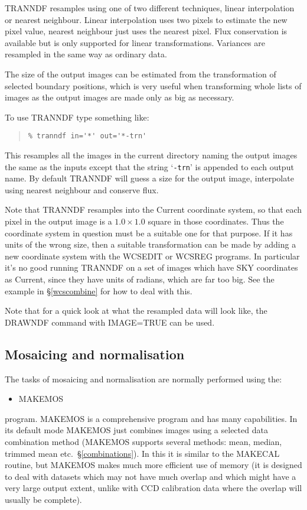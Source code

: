 \documentclass[twoside,11pt]{article}
\newcommand{\hyperref}[4]{#2\ref{#4}#3}
\newcommand{\htmlref}[2]{#1}
\newcommand{\latexhtml}[2]{#1}
\newcommand{\xlabel}[1]{}
\renewcommand{\_}{\texttt{\symbol{95}}}
\newcommand{\ttsize}{\latexhtml{\small}{}}
\newenvironment{myquote}{\begin{quote}\ttsize}{\end{quote}}
\newcommand{\text}[1]{{\ttsize \tt #1}}
\newcommand{\routine}[1]{{\sc #1}}
\newcommand{\xroutine}[1]{\htmlref{{\sc #1}}{#1}}
\begin{document}
\routine{TRANNDF} resamples using 
one of two different techniques, linear interpolation
or nearest neighbour. Linear interpolation uses two pixels to estimate
the new pixel value, nearest neighbour just uses the nearest pixel. Flux
conservation is available but is only supported for linear
transformations. Variances are resampled in the same way as ordinary
data.

The size of the output images can be estimated from the transformation of
selected boundary positions, which is very useful when transforming whole
lists of images as the output images are made only as big as necessary.

To use \routine{TRANNDF} type something like:
\begin{myquote}
\begin{verbatim}
% tranndf in='*' out='*-trn'
\end{verbatim}
\end{myquote}
This resamples all the images in the current directory naming the output
images the same as the inputs except that the string `\text{-trn}' is
appended to each output name. 
By default \routine{TRANNDF} will guess a size for
the output image, interpolate using nearest neighbour and conserve flux.

Note that \routine{TRANNDF} resamples into the Current coordinate system,
so that each pixel in the output image is a $1.0 \times 1.0$ square 
in those coordinates.  Thus the coordinate system in question must be
a suitable one for that purpose.  If it has units of 
the wrong size, then a suitable transformation can be made by
adding a new coordinate system with the
\xroutine{WCSEDIT} or \xroutine{WCSREG} programs.
In particular it's no good running \routine{TRANNDF} on a set of
images which have SKY coordinates as Current, since they have
units of radians, which are far too big.
See the example in \hyperref{the section about WCSREG}{\S }{}{wcscombine}
for how to deal with this.

Note that for a quick look at what the resampled data will look like,
the \xroutine{DRAWNDF} command with IMAGE=TRUE can be used.


\subsection{\xlabel{mosaic_normalise}\label{mos_norm}Mosaicing and 
            normalisation}

The tasks of mosaicing and normalisation are normally performed using the:
\begin{itemize}
\item \xroutine{MAKEMOS}
\end{itemize}
program.
\routine{MAKEMOS} is a comprehensive program and has many
capabilities. In its default mode \routine{MAKEMOS} 
just combines images using a
selected data combination method (\routine{MAKEMOS} supports several
methods: mean, median, trimmed mean etc.\ \S\ref{combinations}).
In this it is similar to the \xroutine{MAKECAL} routine, but
\routine{MAKEMOS} makes much more efficient use of
memory (it is designed to deal with datasets which may not have much
overlap and which might have a very large output extent, unlike with CCD
calibration data where the overlap will usually be complete).
\end{document}
